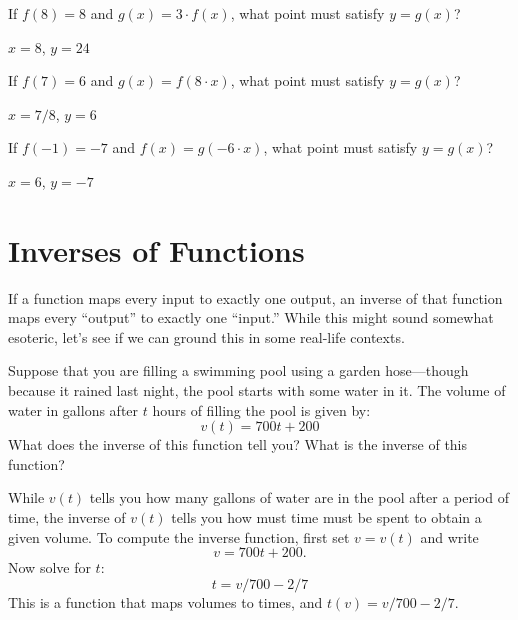 \begin{exercises}
\begin{exercise} 
If $f(8) = 8$ and $g(x)=3\cdot f(x)$, what point must satisfy $y=g(x)$?
\begin{answer}
$x=8$, $y=24$
\end{answer}
\end{exercise}

\begin{exercise} 
If $f(7) = 6$ and $g(x)=f(8\cdot x)$, what point must satisfy $y=g(x)$?
\begin{answer}
$x=7/8$, $y=6$
\end{answer}
\end{exercise}

\begin{exercise} 
If $f(-1) = -7$ and $f(x)=g(-6\cdot x)$, what point must satisfy
$y=g(x)$?
\begin{answer}
$x=6$, $y=-7$
\end{answer}
\end{exercise}


\end{exercises}








\section{Inverses of Functions}


If a function maps every input to exactly one output, an inverse of that
function maps every ``output'' to exactly one ``input.'' While this
might sound somewhat esoteric, let's see if we can ground this in
some real-life contexts.

\begin{example}
Suppose that you are filling a swimming pool using a garden
hose---though because it rained last night, the pool starts with some
water in it. The volume of water in gallons after $t$ hours of
filling the pool is given by:
\[
v(t) = 700t + 200
\]
What does the inverse of this function tell you? What is the inverse
of this function?
\end{example}


\begin{solution}
While $v(t)$ tells you how many gallons of water are in the pool after
a period of time, the inverse of $v(t)$ tells you how must time must
be spent to obtain a given volume. To compute the inverse function,
first set $v=v(t)$ and write
\[
v = 700t + 200.
\]
Now solve for $t$:
\[
t = v/700 - 2/7
\]
This is a function that maps volumes to times, and 
$t(v) = v/700-2/7$.
\end{solution}


